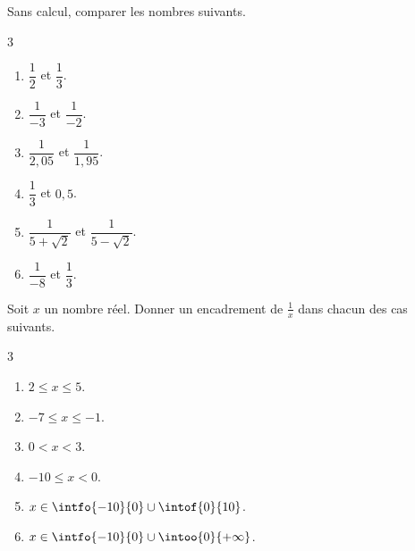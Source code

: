 
\exo

Sans calcul, comparer les nombres suivants.

\vspace{-6pt}
\setlength{\columnsep}{1cm}
\setlength{\columnseprule}{0pt}
\begin{multicols}{3}
\begin{enumerate}
\item $\dfrac{1}{2}$\; et \; $\dfrac{1}{3}$.
\medskip
\item $\dfrac{1}{-3}$\; et \; $\dfrac{1}{-2}$.
\item $\dfrac{1}{2,05}$\; et \; $\dfrac{1}{1,95}$.
\medskip
\item $\dfrac{1}{3}$\; et \; $0,5$.
\item $\dfrac{1}{5+\sqrt{2}}$\; et \; $\dfrac{1}{5-\sqrt{2}}$.
\medskip
\item $\dfrac{1}{-8}$\; et \; $\dfrac{1}{3}$.
\end{enumerate}
\end{multicols}

\exo

Soit $x$ un nombre réel. Donner un encadrement de $\frac{1}{x}$ dans chacun des cas suivants.
\vspace{-6pt}
\setlength{\columnsep}{1cm}
\setlength{\columnseprule}{0pt}
\begin{multicols}{3}
\begin{enumerate}
\item $2 \leqslant x \leqslant 5$.
\medskip
\item $-7 \leqslant x \leqslant -1$.
\item $0 < x < 3$.
\medskip
\item $-10 \leqslant x < 0$.
\item $x\in\intfo{-10}{0}\cup\intof{0}{10}$.
\medskip
\item $x\in\intfo{-10}{0}\cup\intoo{0}{+\infty}$.
\end{enumerate}
\end{multicols}

\exo

